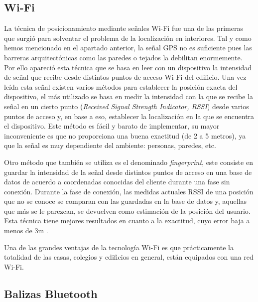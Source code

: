 \subsection{Wi-Fi}

La técnica de posicionamiento mediante señales Wi-Fi fue una de las primeras que surgió para solventar el problema de la localización en interiores. Tal y como hemos mencionado en el apartado anterior, la señal GPS no es suficiente pues las barreras arquitectónicas como las paredes o tejados la debilitan enormemente. Por ello apareció esta técnica que se basa en leer con un dispositivo la intensidad de señal que recibe desde distintos puntos de acceso Wi-Fi del edificio. Una vez leída esta señal existen varios métodos para establecer la posición exacta del dispositivo, el más utilizado se basa en medir la intensidad con la que se recibe la señal en un cierto punto (\textit{Received Signal Strength Indicator, RSSI}) desde varios puntos de acceso y, en base a eso, establecer la localización en la que se encuentra el dispositivo. Este método es fácil y barato de implementar, su mayor inconveniente es que no proporciona una buena exactitud (de 2 a 5 metros), ya que la señal es muy dependiente del ambiente: personas, paredes, etc.

Otro método que también se utiliza es el denominado \textit{fingerprint}, este consiste en guardar la intensidad de la señal desde distintos puntos de acceso en una base de datos de acuerdo a coordenadas conocidas del cliente durante una fase sin conexión. Durante la fase de conexión, las medidas actuales RSSI de una posición que no se conoce se comparan con las guardadas en la base de datos y, aquellas que más se le parezcan, se devuelven como estimación de la posición del usuario. Esta técnica tiene mejores resultados en cuanto a la exactitud, cuyo error baja a menos de 3m \citep{wifipositioning}. 

Una de las grandes ventajas de la tecnología Wi-Fi es que prácticamente la totalidad de las casas, colegios y edificios en general, están equipados con una red Wi-Fi.



\subsection{Balizas Bluetooth}


